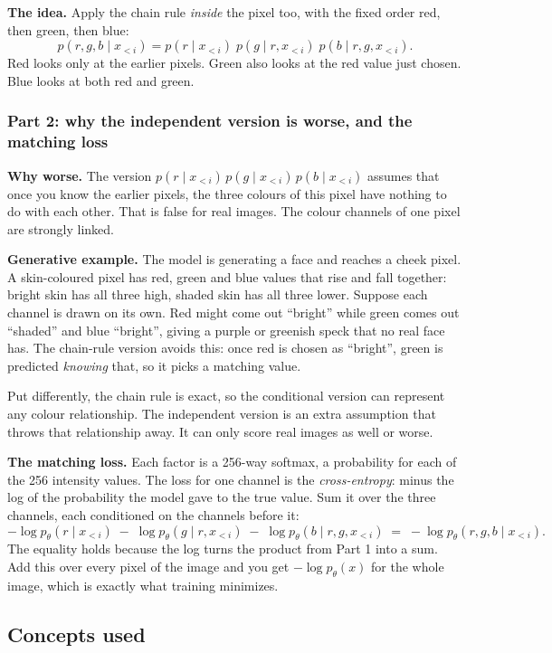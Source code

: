 \documentclass[12pt,a4paper]{article}
\begin{document}
\textbf{The idea.} Apply the chain rule \emph{inside} the pixel too, with the fixed order red, then green, then blue:
\[
p(r, g, b \mid x_{<i}) = p(r \mid x_{<i})\; p(g \mid r, x_{<i})\; p(b \mid r, g, x_{<i}).
\]
Red looks only at the earlier pixels. Green also looks at the red value just chosen. Blue looks at both red and green.

\subsubsection{Part 2: why the independent version is worse, and the matching loss}

\textbf{Why worse.} The version $p(r \mid x_{<i})\,p(g \mid x_{<i})\,p(b \mid x_{<i})$ assumes that once you know the earlier pixels, the three colours of this pixel have nothing to do with each other. That is false for real images. The colour channels of one pixel are strongly linked.

\textbf{Generative example.} The model is generating a face and reaches a cheek pixel. A skin-coloured pixel has red, green and blue values that rise and fall together: bright skin has all three high, shaded skin has all three lower. Suppose each channel is drawn on its own. Red might come out ``bright'' while green comes out ``shaded'' and blue ``bright'', giving a purple or greenish speck that no real face has. The chain-rule version avoids this: once red is chosen as ``bright'', green is predicted \emph{knowing} that, so it picks a matching value.

Put differently, the chain rule is exact, so the conditional version can represent any colour relationship. The independent version is an extra assumption that throws that relationship away. It can only score real images as well or worse.

\textbf{The matching loss.} Each factor is a 256-way softmax, a probability for each of the 256 intensity values. The loss for one channel is the \emph{cross-entropy}: minus the log of the probability the model gave to the true value. Sum it over the three channels, each conditioned on the channels before it:
\[
-\log p_\theta(r \mid x_{<i}) \;-\; \log p_\theta(g \mid r, x_{<i}) \;-\; \log p_\theta(b \mid r, g, x_{<i}) \;=\; -\log p_\theta(r, g, b \mid x_{<i}).
\]
The equality holds because the log turns the product from Part 1 into a sum. Add this over every pixel of the image and you get $-\log p_\theta(x)$ for the whole image, which is exactly what training minimizes.

\subsection{Concepts used}
\end{document}

